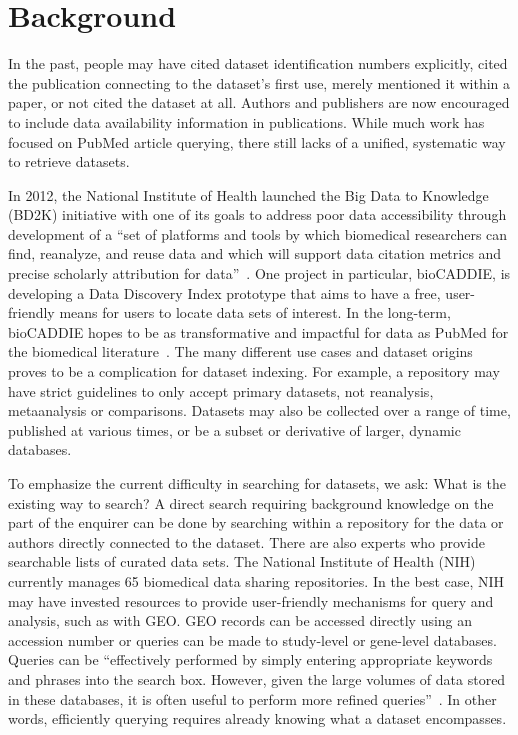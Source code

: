 \section{Background}
In the past, people may have cited dataset identification numbers explicitly, cited the publication connecting to the dataset's first use, merely mentioned it within a paper, or not cited the dataset at all. Authors and publishers are now encouraged to include data availability information in publications. While much work has focused on PubMed article querying, there still lacks of a unified, systematic way to retrieve datasets.

In 2012, the National Institute of Health launched the Big Data to Knowledge (BD2K) initiative with one of its goals to address poor data accessibility through development of a ``set of platforms and tools by which biomedical researchers can find, reanalyze, and reuse data and which will support data citation metrics and precise scholarly attribution for data''~\cite{bd2k}. One project in particular, bioCADDIE, is developing a Data Discovery Index prototype that aims to have a free, user-friendly means for users to locate data sets of interest. In the long-term, bioCADDIE hopes to be as transformative and impactful for data as PubMed for the biomedical literature~\cite{biocaddie}. The many different use cases and dataset origins proves to be a complication for dataset indexing. For example, a repository may have strict guidelines to only accept primary datasets, not reanalysis, metaanalysis or comparisons. Datasets may also be collected over a range of time, published at various times, or be a subset or derivative of larger, dynamic databases.

To emphasize the current difficulty in searching for datasets, we ask: What is the existing way to search? A direct search requiring background knowledge on the part of the enquirer can be done by searching within a repository for the data or authors directly connected to the dataset. There are also experts who provide searchable lists of curated data sets. The National Institute of Health (NIH) currently manages 65 biomedical data sharing repositories. In the best case, NIH may have invested resources to provide user-friendly mechanisms for query and analysis, such as with GEO. GEO records can be accessed directly using an accession number or queries can be made to study-level or gene-level databases. Queries can be ``effectively performed by simply entering appropriate keywords and phrases into the search box. However, given the large volumes of data stored in these databases, it is often useful to perform more refined queries''~\cite{geoquery}. In other words, efficiently querying requires already knowing what a dataset encompasses.

